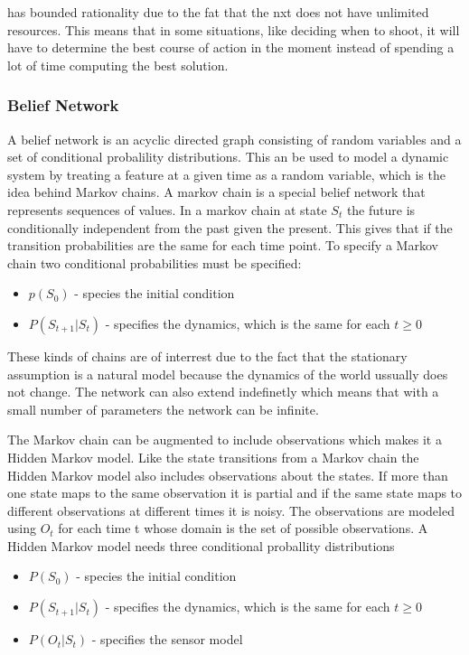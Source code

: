 \namep has bounded rationality due to the fat that the nxt does not have
unlimited resources. This means that in some situations, like deciding when
to shoot, it will have to determine the best course of action in the moment
instead of spending a lot of time computing the best solution. 

\subsubsection{Belief Network}
A belief network is an acyclic directed graph consisting of random variables and
a set of conditional probalility distributions. This an be used to model a
dynamic system by treating a feature at a given time as a random variable, which
is the idea behind Markov chains. A markov chain is a special belief network
that represents sequences of values.
In a markov chain at state $S_t$ the future is conditionally independent from
the past given the present. This gives that if the transition probabilities are
the same for each time point. To specify a Markov chain two conditional
probabilities must be specified:
\begin{itemize}
  \item $p(S_0)$ - species the initial condition
  \item $P(S_{t+1}|S_t)$ - specifies the dynamics, which is the same for each $t
  \geq 0$
\end{itemize}

These kinds of chains are of interrest due to the fact that the stationary
assumption is a natural model because the dynamics of the world ussually does
not change. The network can also extend indefinetly which means that with a
small number of parameters the network can be infinite.\nl

The Markov chain can be augmented to include observations which makes it a
Hidden Markov model. Like the state transitions from a Markov chain the Hidden
Markov model also includes observations about the states. If more than one state
maps to the same observation it is partial and if the same state maps to
different observations at different times it is noisy. The observations are
modeled using $O_t$ for each time t whose domain is the set of possible
observations. A Hidden Markov model needs three conditional proballity
distributions
\begin{itemize}
  \item $P(S_0)$ - species the initial condition
  \item $P(S_{t+1}|S_t)$ - specifies the dynamics, which is the same for each $t
  \geq 0$
  \item $P(O_t|S_t)$ - specifies the sensor model
\end{itemize}

